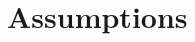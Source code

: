 \documentclass[modern]{aastex63}
\newcommand{\gaia}{\textsl{Gaia}}
\newcommand{\galah}{\acronym{GALAH}}
\begin{document}




\section{Assumptions}
\end{document}
